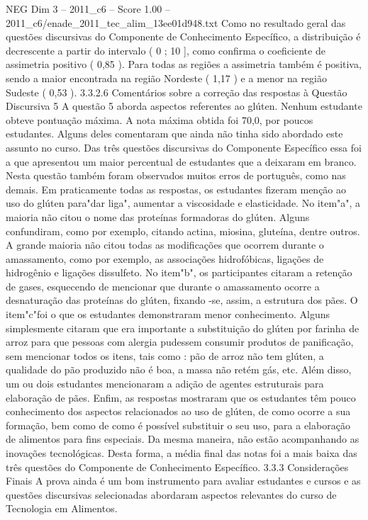 \begin{textsample}{NEG Dim 3 – 2011\_c6 – Score 1.00 – 2011\_c6/enade\_2011\_tec\_alim\_13ee01d948.txt}
Como no resultado geral das questões discursivas do Componente de Conhecimento Específico, a distribuição é decrescente a partir do intervalo ( 0 ; 10 ], como confirma o coeficiente de assimetria positivo ( 0,85 ).
Para todas as regiões a assimetria também é positiva, sendo a maior encontrada na região Nordeste ( 1,17 ) e a menor na região Sudeste ( 0,53 ). 3.3.2.6 Comentários sobre a correção das respostas à Questão Discursiva 5 A questão 5 aborda aspectos referentes ao glúten.
Nenhum estudante obteve pontuação máxima.
A nota máxima obtida foi 70,0, por poucos estudantes.
Alguns deles comentaram que ainda não tinha sido abordado este assunto no curso.
Das três questões discursivas do Componente Específico essa foi a que apresentou um maior percentual de estudantes que a deixaram em branco.
Nesta questão também foram observados muitos erros de português, como nas demais.
Em praticamente todas as respostas, os estudantes fizeram menção ao uso do glúten para"dar liga", aumentar a viscosidade e elasticidade.
No item"a", a maioria não citou o nome das proteínas formadoras do glúten.
Alguns confundiram, como por exemplo, citando actina, miosina, gluteína, dentre outros.
A grande maioria não citou todas as modificações que ocorrem durante o amassamento, como por exemplo, as associações hidrofóbicas, ligações de hidrogênio e ligações dissulfeto.
No item"b", os participantes citaram a retenção de gases, esquecendo de mencionar que durante o amassamento ocorre a desnaturação das proteínas do glúten, fixando -se, assim, a estrutura dos pães.
O item"c"foi o que os estudantes demonstraram menor conhecimento.
Alguns simplesmente citaram que era importante a substituição do glúten por farinha de arroz para que pessoas com alergia pudessem consumir produtos de panificação, sem mencionar todos os itens, tais como : pão de arroz não tem glúten, a qualidade do pão produzido não é boa, a massa não retém gás, etc.
Além disso, um ou dois estudantes mencionaram a adição de agentes estruturais para elaboração de pães.
Enfim, as respostas mostraram que os estudantes têm pouco conhecimento dos aspectos relacionados ao uso de glúten, de como ocorre a sua formação, bem como de como é possível substituir o seu uso, para a elaboração de alimentos para fins especiais.
Da mesma maneira, não estão acompanhando as inovações tecnológicas.
Desta forma, a média final das notas foi a mais baixa das três questões do Componente de Conhecimento Específico. 3.3.3 Considerações Finais A prova ainda é um bom instrumento para avaliar estudantes e cursos e as questões discursivas selecionadas abordaram aspectos relevantes do curso de Tecnologia em Alimentos.

\end{textsample}
